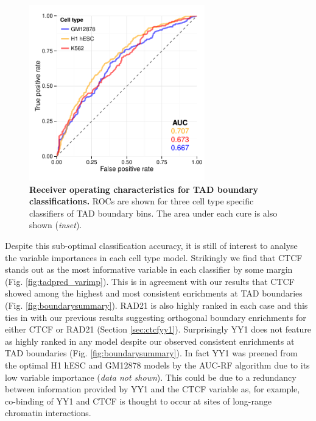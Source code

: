 \documentclass[a4paper,11pt,oneside]{book}
\begin{document}
\begin{figure}
\begin{center} 
\includegraphics[width=3in]{figs/tadpred_auroc.pdf}
\captionsetup{width=\textwidth}
\caption[ Receiver operating characteristics for TAD boundary classifications. ]{ {\bf Receiver operating characteristics for TAD boundary classifications. }
ROCs are shown for three cell type specific classifiers of TAD boundary bins. The area under each cure is also shown (\emph{inset}).
}\label{fig:tadpred_auroc}
\end{center}
\end{figure} 

Despite this sub-optimal classification accuracy, it is still of interest to analyse the variable importances in each cell type model. Strikingly we find that CTCF stands out as the most informative variable in each classifier by some margin (Fig. \ref{fig:tadpred_varimp}). This is in agreement with our results that CTCF showed among the highest and most consistent enrichments at TAD boundaries (Fig. \ref{fig:boundarysummary}). RAD21 is also highly ranked in each case and this ties in with our previous results suggesting orthogonal boundary enrichments for either CTCF or RAD21 (Section \ref{sec:ctcfyy1}). Surprisingly YY1 does not feature as highly ranked in any model despite our observed consistent enrichments at TAD boundaries (Fig. \ref{fig:boundarysummary}). In fact YY1 was preened from the optimal H1 hESC and GM12878 models by the AUC-RF algorithm due to its low variable importance (\emph{data not shown}). This could be due to a redundancy between information provided by YY1 and the CTCF variable as, for example, co-binding of YY1 and CTCF is thought to occur at sites of long-range chromatin interactions.\cite{Atchison2014} 
\end{document}
